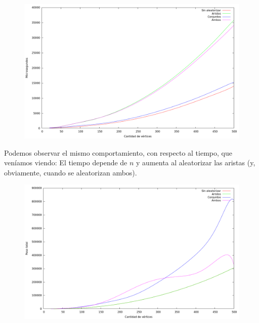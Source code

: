 \begin{figure}[h]
  \begin{center}
    \includegraphics[scale=0.35]{imagenes/grasp-goloso-n-tiempo.png}
  \end{center}
\end{figure}

\vspace*{0.5cm}

Podemos observar el mismo comportamiento, con respecto al tiempo, que
veníamos viendo: El tiempo depende de $n$ y aumenta al aleatorizar las aristas
(y, obviamente, cuando se aleatorizan ambos).

\vspace*{0.5cm}

\begin{figure}[h]
  \begin{center}
    \includegraphics[scale=0.35]{imagenes/grasp-goloso-n-peso.png}
  \end{center}
\end{figure}

